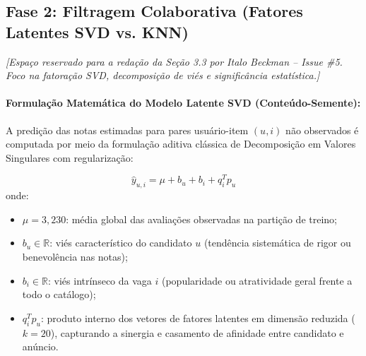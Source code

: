 \subsection{Fase 2: Filtragem Colaborativa (Fatores Latentes SVD vs. KNN)}
\label{sec:fase2_cf}

\noindent\textit{[Espaço reservado para a redação da Seção 3.3 por Italo Beckman -- Issue \#5. Foco na fatoração SVD, decomposição de viés e significância estatística.]}

\paragraph{Formulação Matemática do Modelo Latente SVD (Conteúdo-Semente):}
A predição das notas estimadas para pares usuário-item $(u, i)$ não observados é computada por meio da formulação aditiva clássica de Decomposição em Valores Singulares com regularização:

\begin{equation}
    \hat{y}_{u,i} = \mu + b_u + b_i + q_i^T p_u
\end{equation}
onde:
\begin{itemize}
    \item $\mu = 3{,}230$: média global das avaliações observadas na partição de treino;
    \item $b_u \in \mathbb{R}$: viés característico do candidato $u$ (tendência sistemática de rigor ou benevolência nas notas);
    \item $b_i \in \mathbb{R}$: viés intrínseco da vaga $i$ (popularidade ou atratividade geral frente a todo o catálogo);
    \item $q_i^T p_u$: produto interno dos vetores de fatores latentes em dimensão reduzida ($k=20$), capturando a sinergia e casamento de afinidade entre candidato e anúncio.
\end{itemize}

